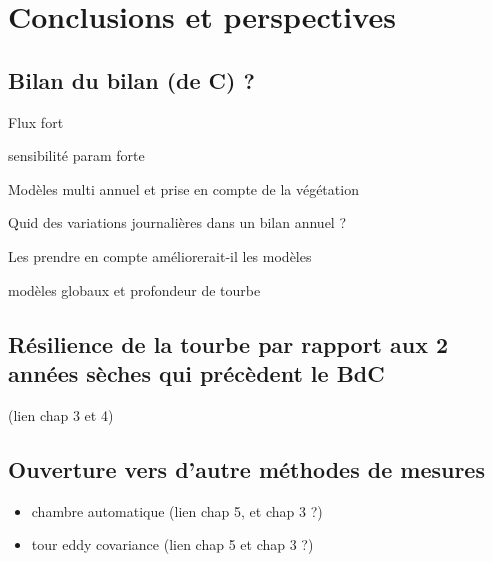\chapter*{Conclusions et perspectives}
\newpage

\section{Bilan du bilan (de C) ?}

Flux fort

sensibilité param forte

Modèles multi annuel et prise en compte de la végétation

Quid des variations journalières dans un bilan annuel ? 

Les prendre en compte améliorerait-il les modèles

modèles globaux et profondeur de tourbe

\section{Résilience de la tourbe par rapport aux 2 années sèches qui précèdent le BdC}
(lien chap 3 et 4)

\section{Ouverture vers d'autre méthodes de mesures}
\begin{itemize}
\item chambre automatique (lien chap 5, et chap 3 ?)
\item tour eddy covariance (lien chap 5 et chap 3 ?)
\end{itemize}
